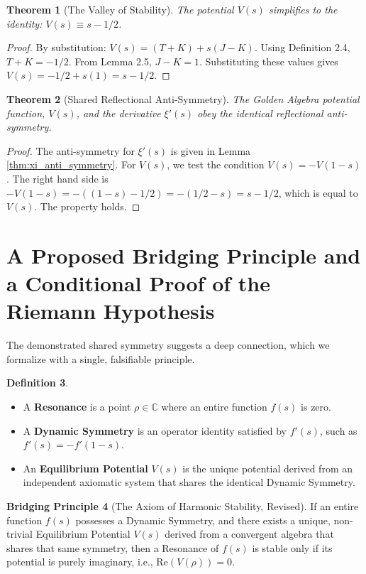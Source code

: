 \documentclass{article}
\theoremstyle{plain}
\newtheorem{theorem}{Theorem}[section]
\theoremstyle{definition}
\newtheorem{definition}[theorem]{Definition}
\newtheorem{conjecture}[theorem]{Bridging Principle}
\theoremstyle{remark}
\begin{document}
\begin{theorem}[The Valley of Stability]
The potential $V(s)$ simplifies to the identity: $V(s) \equiv s - 1/2$.
\end{theorem}
\begin{proof}
By substitution: $V(s) = (T+K) + s(J-K)$. Using Definition 2.4, $T+K = -1/2$. From Lemma 2.5, $J-K=1$. Substituting these values gives $V(s) = -1/2 + s(1) = s - 1/2$.
\end{proof}

\begin{theorem}[Shared Reflectional Anti-Symmetry]
The Golden Algebra potential function, $V(s)$, and the derivative $\xi'(s)$ obey the identical reflectional anti-symmetry.
\end{theorem}
\begin{proof}
The anti-symmetry for $\xi'(s)$ is given in Lemma \ref{thm:xi_anti_symmetry}. For $V(s)$, we test the condition $V(s) = -V(1-s)$. The right hand side is $-V(1-s) = -((1-s) - 1/2) = -(1/2 - s) = s - 1/2$, which is equal to $V(s)$. The property holds.
\end{proof}

\section{A Proposed Bridging Principle and a Conditional Proof of the Riemann Hypothesis}
The demonstrated shared symmetry suggests a deep connection, which we formalize with a single, falsifiable principle.

\begin{definition}
\begin{itemize}
    \item A \textbf{Resonance} is a point $\rho \in \mathbb{C}$ where an entire function $f(s)$ is zero.
    \item A \textbf{Dynamic Symmetry} is an operator identity satisfied by $f'(s)$, such as $f'(s) = -f'(1-s)$.
    \item An \textbf{Equilibrium Potential} $V(s)$ is the unique potential derived from an independent axiomatic system that shares the identical Dynamic Symmetry.
\end{itemize}
\end{definition}

\begin{conjecture}[The Axiom of Harmonic Stability, Revised]
\label{conj:stability}
If an entire function $f(s)$ possesses a Dynamic Symmetry, and there exists a unique, non-trivial Equilibrium Potential $V(s)$ derived from a convergent algebra that shares that same symmetry, then a Resonance of $f(s)$ is stable only if its potential is purely imaginary, i.e., $\mathrm{Re}(V(\rho))=0$.
\end{conjecture}
\end{document}
